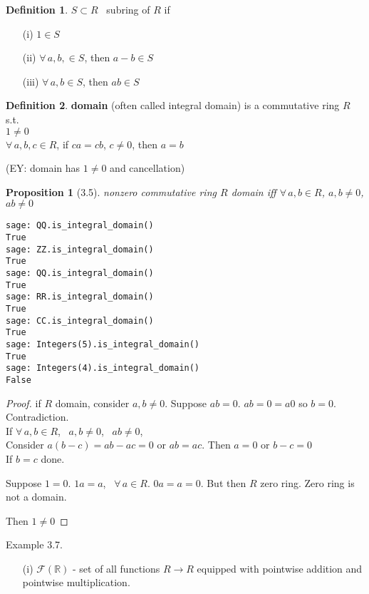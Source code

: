 \documentclass[twoside,landscape]{amsart}
\theoremstyle{plain}
\newtheorem{proposition}{Proposition}
\theoremstyle{definition}
\newtheorem{definition}{Definition}
\theoremstyle{remark}
\begin{document}
\begin{multicols*}{2}
\begin{definition}
$S \subset R$ \quad \, subring of $R$ if 
\begin{enumerate}
\item[(i)] $ 1 \in S$ 
\item[(ii)] $\forall \, a,b, \in S$, then $a-b\in S$ \\ 
\item[(iii)] $\forall \, a,b \in S$, then $ab \in S$
\end{enumerate}
\end{definition}

\begin{definition}
  \textbf{domain} (often called integral domain) is a commutative ring $R$ s.t.  \\
$1 \neq 0$ \\
$\forall \, a,b, c \in R$, if $ca=cb$, $c\neq 0$, then $a=b$

(EY: domain has $1\neq 0$ and cancellation)
\end{definition}


\begin{proposition}[3.5]
nonzero commutative ring $R$ domain iff $\forall \, a,b \in R$, $a,b \neq 0$, $ab\neq 0$
\end{proposition}


\begin{lstlisting}
sage: QQ.is_integral_domain()
True
sage: ZZ.is_integral_domain()
True
sage: QQ.is_integral_domain()
True
sage: RR.is_integral_domain()
True
sage: CC.is_integral_domain()
True
sage: Integers(5).is_integral_domain()
True
sage: Integers(4).is_integral_domain()
False
\end{lstlisting}

\begin{proof}
  if $R$ domain, consider $a,b \neq 0$.  Suppose $ab=0$.  $ab=0 = a0$ so $b=0$.  Contradiction.  \\
If $\forall \, a,b \in R$, \, $a,b \neq 0$, \, $ab\neq 0$,  \\
Consider $a(b-c) = ab-ac=0$ or $ab=ac$.  Then $a=0$ or $b-c =0$ \\
If $b=c$ done.  

Suppose $1=0$.  $1a = a$, \, $\forall \, a \in R$.  $0a =a=0$.  But then $R$ zero ring.  Zero ring is not a domain.  

Then $1\neq 0$
\end{proof}


Example 3.7. 
\begin{enumerate}
\item[(i)] $\mathcal{F}(\mathbb{R})$ - set of all functions $R \to R$ equipped with pointwise addition and pointwise multiplication.  


\end{enumerate}
\end{multicols*}
\end{document}
